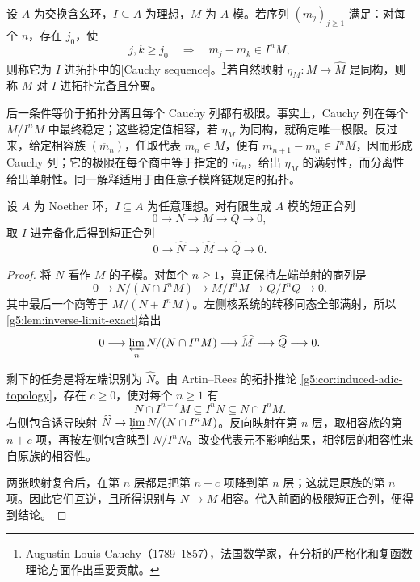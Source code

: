 \begin{definition}\label{g5:def:adic-completeness}
	设 \(A\) 为交换含幺环，\(I\subseteq A\) 为理想，\(M\) 为 \(A\) 模。若序列 \((m_j)_{j\geq1}\) 满足：对每个 \(n\)，存在 \(j_0\)，使
	\[
		j,k\geq j_0\quad\Longrightarrow\quad m_j-m_k\in I^nM,
	\]
	则称它为 \(I\) 进拓扑中的[Cauchy sequence]。\footnote{Augustin-Louis Cauchy（1789--1857），法国数学家，在分析的严格化和复函数理论方面作出重要贡献。}若自然映射 \(\eta_M:M\to\widehat M\) 是同构，则称 \(M\) 对 \(I\) 进拓扑完备且分离。
\end{definition}

后一条件等价于拓扑分离且每个 Cauchy 列都有极限。事实上，Cauchy 列在每个 \(M/I^nM\) 中最终稳定；这些稳定值相容，若 \(\eta_M\) 为同构，就确定唯一极限。反过来，给定相容族 \((\overline m_n)\)，任取代表 \(m_n\in M\)，便有 \(m_{n+1}-m_n\in I^nM\)，因而形成 Cauchy 列；它的极限在每个商中等于指定的 \(\overline m_n\)，给出 \(\eta_M\) 的满射性，而分离性给出单射性。同一解释适用于由任意子模降链规定的拓扑。

\begin{theorem}\label{g5:thm:completion-exact}
	设 \(A\) 为 Noether 环，\(I\subseteq A\) 为任意理想。对有限生成 \(A\) 模的短正合列
	\[
		0\longrightarrow N\longrightarrow M\longrightarrow Q\longrightarrow0,
	\]
	取 \(I\) 进完备化后得到短正合列
	\[
		0\longrightarrow\widehat N\longrightarrow\widehat M
		\longrightarrow\widehat Q\longrightarrow0.
	\]
\end{theorem}
\begin{proof}
	将 \(N\) 看作 \(M\) 的子模。对每个 \(n\geq1\)，真正保持左端单射的商列是
	\[
		0\longrightarrow N/(N\cap I^nM)
		\longrightarrow M/I^nM
		\longrightarrow Q/I^nQ\longrightarrow0.
	\]
	其中最后一个商等于 \(M/(N+I^nM)\)。左侧核系统的转移同态全部满射，所以\cref{g5:lem:inverse-limit-exact}给出
	\[
		0\longrightarrow\varprojlim_n N/(N\cap I^nM)
		\longrightarrow\widehat M\longrightarrow\widehat Q\longrightarrow0.
	\]

	剩下的任务是将左端识别为 \(\widehat N\)。由 Artin–Rees 的拓扑推论 \cref{g5:cor:induced-adic-topology}，存在 \(c\geq0\)，使对每个 \(n\geq1\) 有
	\[
		N\cap I^{n+c}M\subseteq I^nN\subseteq N\cap I^nM.
	\]
	右侧包含诱导映射
	\(\widehat N\to\varprojlim N/(N\cap I^nM)\)。反向映射在第 \(n\) 层，取相容族的第 \(n+c\) 项，再按左侧包含映到 \(N/I^nN\)。改变代表元不影响结果，相邻层的相容性来自原族的相容性。

	两张映射复合后，在第 \(n\) 层都是把第 \(n+c\) 项降到第 \(n\) 层；这就是原族的第 \(n\) 项。因此它们互逆，且所得识别与 \(N\to M\) 相容。代入前面的极限短正合列，便得到结论。
\end{proof}

